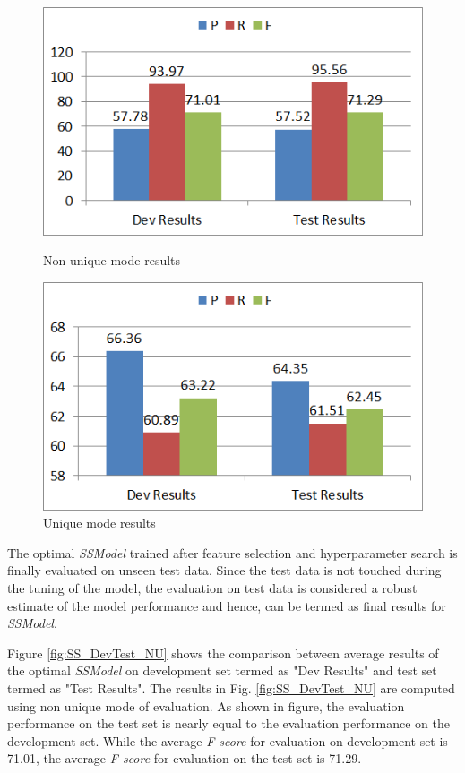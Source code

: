 \begin{figure}
\centering
\begin{minipage}{.5\textwidth}
  \centering
  \includegraphics[width=.95\textwidth]{figures/CompDevTestResultsNonUniq.png}
  \caption{Non unique mode results}
  \label{fig:SS_DevTest_NU}
\end{minipage}%
\begin{minipage}{.5\textwidth}
  \centering
  \includegraphics[width=.95\textwidth]{figures/CompDevTestResultsUniq.png}
  \caption{Unique mode results}
  \label{fig:SS_DevTest_U}
\end{minipage}
\end{figure}

The optimal \textit{SSModel} trained after feature selection and hyperparameter search is finally evaluated on unseen test data. Since the test data is not touched during the tuning of the model, the evaluation on test data is considered a robust estimate of the model performance and hence, can be termed as final results for \textit{SSModel}.

Figure \ref{fig:SS_DevTest_NU} shows the comparison between average results of the optimal \textit{SSModel} on development set termed as "Dev Results" and test set termed as "Test Results". The results in Fig. \ref{fig:SS_DevTest_NU} are computed using non unique mode of evaluation. As shown in figure, the evaluation performance on the test set is nearly equal to the evaluation performance on the development set. While the average \textit{F score} for evaluation on development set is 71.01, the average \textit{F score} for evaluation on the test set is 71.29.

